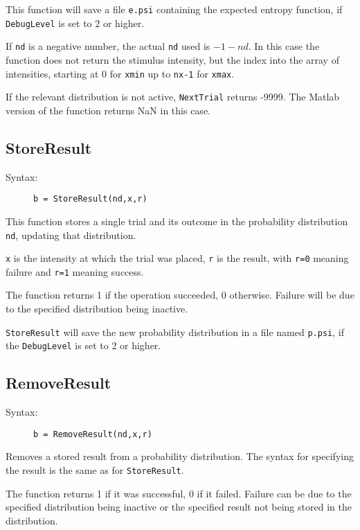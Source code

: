 \documentclass[10pt,letterpaper]{article}
\begin{document}
This function will save a file {\tt e.psi} containing the expected entropy 
function, if {\tt DebugLevel} is set to 2 or higher.

If {\tt nd} is a negative number, the actual {\tt nd} used is {\tt $-1-nd$}. 
In this case the function does not return the stimulus intensity, but the index 
into the array of intensities, starting at 0 for {\tt xmin} up to {\tt nx-1} for
{\tt xmax}.

If the relevant distribution is not active, {\tt NextTrial} returns -9999. The Matlab
version of the function returns NaN in this case.

\subsection{StoreResult}

\begin{description}
\item[Syntax:] {\tt b = StoreResult(nd,x,r)}
\end{description}

This function stores a single trial and its outcome in the probability 
distribution {\tt nd}, updating that distribution.

{\tt x} is the intensity at which the trial was placed, {\tt r} is the result,
with {\tt r=0} meaning failure and {\tt r=1} meaning success.

The function returns 1 if the operation succeeded, 0 otherwise. Failure will be due
to the specified distribution being inactive.

{\tt StoreResult} will save the new probability distribution in a file named 
{\tt p.psi}, if the {\tt DebugLevel} is set to 2 or higher.


\subsection{RemoveResult}

\begin{description}
\item[Syntax:] {\tt b = RemoveResult(nd,x,r)}
\end{description}

Removes a stored result from a probability distribution. The syntax for 
specifying the result is the same as for {\tt StoreResult}.

The function returns 1 if it was successful, 0 if it failed. Failure can be due 
to the specified distribution being inactive or the specified result not being 
stored in the distribution.
\end{document}
